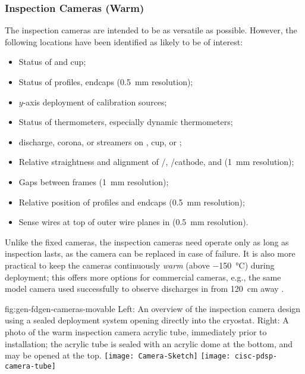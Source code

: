 \subsubsection{Inspection Cameras (Warm)}

The inspection cameras are intended to be as versatile as possible.
However, the following locations have been identified as likely
to be of interest:
\begin{itemize}
\item Status of  \fdth and cup;
\item Status of  profiles, endcaps (\SI{0.5}{mm} resolution);
\item $y$-axis deployment of calibration sources;
\item Status of thermometers, especially dynamic thermometers;
\item {} discharge, corona, or streamers on  \fdth, cup, or ;
\item Relative straightness and alignment of /, /cathode, and  (\SI{1}{mm} resolution);
\item Gaps between  frames (\SI{1}{mm} resolution);
\item Relative position of profiles and endcaps (\SI{0.5}{mm} resolution);
\item Sense wires at top of outer wire planes in \single {} (\SI{0.5}{mm} resolution).
\end{itemize}

Unlike the fixed cameras, the inspection cameras need operate only as
long as inspection lasts, as the camera can be replaced in case of failure.  It
is also more practical to keep the cameras continuously \textit{warm}
(above \SI{-150}{\celsius}) during deployment; this offers %
more options for commercial cameras, e.g., %
the same model camera used successfully to observe discharges
in \lar from \SI{120}{cm} away \cite{Auger:2015xlo}.

\begin{dunefigure}{fig:gen-fdgen-cameras-movable}
  {Left: An overview of the inspection camera design using a sealed deployment system opening directly into the cryostat. Right: A photo of the  warm inspection camera acrylic tube, immediately prior to installation; the acrylic tube is sealed with an acrylic dome at the bottom, and may be opened at the top.}
  \texttt{[image: Camera-Sketch]}%
  \texttt{[image: cisc-pdsp-camera-tube]}%
\end{dunefigure}

